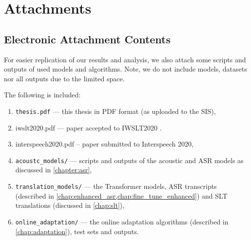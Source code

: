 \documentclass[12pt,a4paper]{report}
\let\openright=\clearpage
\begin{document}
\chapter{Attachments}

\section{Electronic Attachment Contents}
For easier replication of our results and analysis, we also attach some scripts and outputs of used models and algorithms. Note, we do not include models, datasets nor all outputs due to the limited space.

The following is included:

\begin{enumerate}
    \item \texttt{thesis.pdf} --- this thesis in PDF format (as uploaded to the SIS),
    \item iwslt2020.pdf --- paper accepted to IWSLT2020 \citep{iwslt20-polak}.
    \item interspeech2020.pdf -- paper submitted to Interspeech 2020,
    \item \texttt{acoustc\_models/} --- scripts and outputs of the acoustic and ASR models as discussed in \cref{chapter:asr},
    \item \texttt{translation\_models/} --- the Transformer models, ASR transcripts (described in \cref{chap:enhanced_asr,chap:fine_tune_enhanced}) and SLT translations (discussed in \cref{chap:slt}),
    \item \texttt{online\_adaptation/} --- the online adaptation algorithms (described in \cref{chap:adaptation}), test sets and outputs.
\end{enumerate}

\openright
\end{document}
